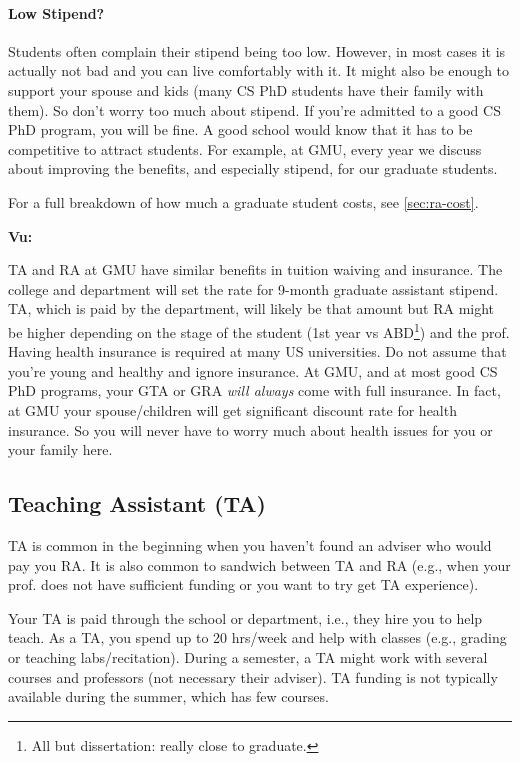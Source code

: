 \documentclass[oneside,11pt,dvipsnames]{book}
\newenvironment{commentbox}[1][]{
  \small
  \begin{mybox}
    {\small \textbf{#1}}
  }{
  \end{mybox}
}
\begin{document}
\paragraph{Low Stipend?} Students often complain their stipend being too low. However, in most cases it is actually not bad and you can live comfortably with it.  It might also be enough to support your spouse and kids (many CS PhD students have their family with them). So don't worry too much about stipend.  If you're admitted to a good CS PhD program, you will be fine. A good school would know that it has to be competitive to attract students.  For example, at GMU, every year we discuss about improving the benefits, and especially stipend, for our graduate students.

For a full breakdown of how much a graduate student costs, see \autoref{sec:ra-cost}.

\begin{commentbox}[Vu:]
  TA and RA at GMU have similar benefits in tuition waiving and insurance.  The college and department will set the rate for 9-month graduate assistant stipend.  TA, which is paid by the department, will likely be that amount but RA might be higher depending on the stage of the student (1st year vs ABD\footnote{All but dissertation: really close to graduate.}) and the prof.
  \tcblower
  Having health insurance is required at many US universities.  Do not assume that you're young and healthy and ignore insurance.  At GMU, and at most good CS PhD programs, your GTA or GRA \emph{will always} come with full insurance. In fact, at GMU your spouse/children will get significant discount rate for health insurance.  So you will never have to worry much about health issues for you or your family here.
\end{commentbox}


\subsection{Teaching Assistant (TA)}\label{sec:ta}

TA is common in the beginning when you haven't found an adviser who would pay you RA. It is also common to sandwich between TA and RA (e.g., when your prof. does not have sufficient funding or you want to try get TA experience).

Your TA is paid through the school or department, i.e., they hire you to help teach.
As a TA, you spend up to 20 hrs/week and help with classes (e.g., grading or teaching labs/recitation).
During a semester, a TA might work with several courses and professors (not necessary their adviser).  TA funding is not typically available during the summer, which has few courses.
\end{document}
